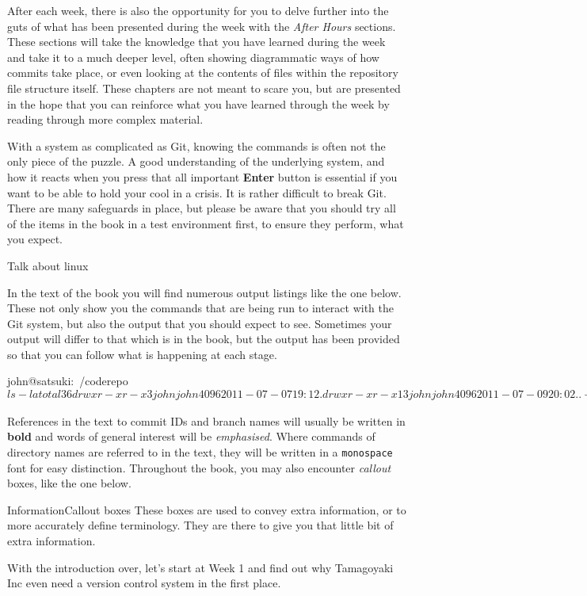 After each week, there is also the opportunity for you to delve further into the guts of what has been presented during the week with the \emph{After Hours} sections.
These sections will take the knowledge that you have learned during the week and take it to a much deeper level, often showing diagrammatic ways of how commits take place, or even looking at the contents of files within the repository file structure itself.
These chapters are not meant to scare you, but are presented in the hope that you can reinforce what you have learned through the week by reading through more complex material.

With a system as complicated as Git, knowing the commands is often not the only piece of the puzzle.
A good understanding of the underlying system, and how it reacts when you press that all important \textbf{Enter} button is essential if you want to be able to hold your cool in a crisis.
It is rather difficult to break Git.
There are many safeguards in place, but please be aware that you should try all of the items in the book in a test environment first, to ensure they perform, what you expect.

Talk about linux

In the text of the book you will find numerous output listings like the one below.
These not only show you the commands that are being run to interact with the Git system, but also the output that you should expect to see.
Sometimes your output will differ to that which is in the book, but the output has been provided so that you can follow what is happening at each stage.

\begin{code}
john@satsuki:~/coderepo$ ls -la
total 36
drwxr-xr-x  3 john john 4096 2011-07-07 19:12 .
drwxr-xr-x 13 john john 4096 2011-07-09 20:02 ..
-rw-r--r--  1 john john   35 2011-07-07 19:12 another_file
-rw-r--r--  1 john john   25 2011-07-07 19:12 cont_dev
drwxrwxr-x  8 john john 4096 2011-07-07 19:17 .git
-rw-r--r--  1 john john    8 2011-03-31 22:15 temp_file
john@satsuki:~/coderepo$
\end{code}

References in the text to commit IDs and branch names will usually be written in \textbf{bold} and words of general interest will be \emph{emphasised}.
Where commands of directory names are referred to in the text, they will be written in a \texttt{monospace} font for easy distinction.
Throughout the book, you may also encounter \emph{callout} boxes, like the one below.

\begin{callout}{Information}{Callout boxes}
These boxes are used to convey extra information, or to more accurately define terminology.
They are there to give you that little bit of extra information.
\end{callout}

With the introduction over, let's start at Week 1 and find out why Tamagoyaki Inc even need a version control system in the first place.
